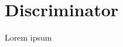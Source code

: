 \documentclass[../main.tex]{subfiles}
\begin{document}
\chapter{Discriminator}

Lorem ipsum
\end{document}
